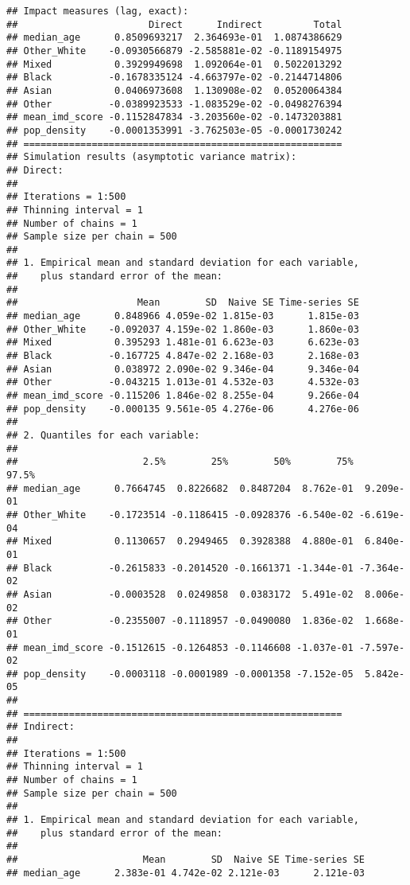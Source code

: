\documentclass[
]{book}
\begin{document}
\begin{verbatim}
## Impact measures (lag, exact):
##                       Direct      Indirect         Total
## median_age      0.8509693217  2.364693e-01  1.0874386629
## Other_White    -0.0930566879 -2.585881e-02 -0.1189154975
## Mixed           0.3929949698  1.092064e-01  0.5022013292
## Black          -0.1678335124 -4.663797e-02 -0.2144714806
## Asian           0.0406973608  1.130908e-02  0.0520064384
## Other          -0.0389923533 -1.083529e-02 -0.0498276394
## mean_imd_score -0.1152847834 -3.203560e-02 -0.1473203881
## pop_density    -0.0001353991 -3.762503e-05 -0.0001730242
## ========================================================
## Simulation results (asymptotic variance matrix):
## Direct:
## 
## Iterations = 1:500
## Thinning interval = 1 
## Number of chains = 1 
## Sample size per chain = 500 
## 
## 1. Empirical mean and standard deviation for each variable,
##    plus standard error of the mean:
## 
##                     Mean        SD  Naive SE Time-series SE
## median_age      0.848966 4.059e-02 1.815e-03      1.815e-03
## Other_White    -0.092037 4.159e-02 1.860e-03      1.860e-03
## Mixed           0.395293 1.481e-01 6.623e-03      6.623e-03
## Black          -0.167725 4.847e-02 2.168e-03      2.168e-03
## Asian           0.038972 2.090e-02 9.346e-04      9.346e-04
## Other          -0.043215 1.013e-01 4.532e-03      4.532e-03
## mean_imd_score -0.115206 1.846e-02 8.255e-04      9.266e-04
## pop_density    -0.000135 9.561e-05 4.276e-06      4.276e-06
## 
## 2. Quantiles for each variable:
## 
##                      2.5%        25%        50%        75%      97.5%
## median_age      0.7664745  0.8226682  0.8487204  8.762e-01  9.209e-01
## Other_White    -0.1723514 -0.1186415 -0.0928376 -6.540e-02 -6.619e-04
## Mixed           0.1130657  0.2949465  0.3928388  4.880e-01  6.840e-01
## Black          -0.2615833 -0.2014520 -0.1661371 -1.344e-01 -7.364e-02
## Asian          -0.0003528  0.0249858  0.0383172  5.491e-02  8.006e-02
## Other          -0.2355007 -0.1118957 -0.0490080  1.836e-02  1.668e-01
## mean_imd_score -0.1512615 -0.1264853 -0.1146608 -1.037e-01 -7.597e-02
## pop_density    -0.0003118 -0.0001989 -0.0001358 -7.152e-05  5.842e-05
## 
## ========================================================
## Indirect:
## 
## Iterations = 1:500
## Thinning interval = 1 
## Number of chains = 1 
## Sample size per chain = 500 
## 
## 1. Empirical mean and standard deviation for each variable,
##    plus standard error of the mean:
## 
##                      Mean        SD  Naive SE Time-series SE
## median_age      2.383e-01 4.742e-02 2.121e-03      2.121e-03

\end{verbatim}
\end{document}
